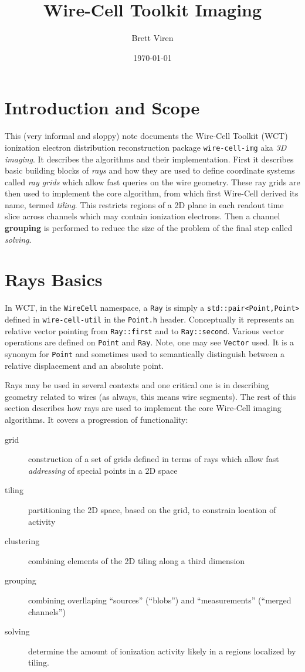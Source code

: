 \documentclass[11pt]{article}
\author{Brett Viren}
\date{\today}
\title{Wire-Cell Toolkit Imaging}
\begin{document}
\maketitle

\section{Introduction and Scope}

This (very informal and sloppy) note documents the Wire-Cell Toolkit (WCT) ionization electron distribution reconstruction package \texttt{wire-cell-img} aka \textit{3D imaging}. 
It describes the algorithms and their implementation. 
First it describes basic building blocks of \textit{rays} and how they are used to define coordinate systems called \textit{ray grids} which allow fast queries on the wire geometry. 
These ray grids are then used to implement the core algorithm, from which first Wire-Cell derived its name, termed \textit{tiling}. 
This restricts regions of a 2D plane in each readout time slice across channels which may contain ionization electrons. 
Then a channel \textbf{grouping} is performed to reduce the size of the problem of the final step called \textit{solving}.

\section{Rays Basics}
\label{sec:raybasics}

In WCT, in the \texttt{WireCell} namespace, a \texttt{Ray} is simply a \texttt{std::pair<Point,Point>} defined in \texttt{wire-cell-util} in the \texttt{Point.h} header.  Conceptually it represents an relative vector pointing from \texttt{Ray::first} and to \texttt{Ray::second}.  Various vector operations are defined on \texttt{Point} and \texttt{Ray}.  Note, one may see \texttt{Vector} used.  It is a synonym for \texttt{Point} and sometimes used to semantically distinguish between a relative displacement and an absolute point. 

Rays may be used in several contexts and one critical one is in describing geometry related to wires (as always, this means wire segments).  The rest of this section describes how rays are used to implement the core Wire-Cell imaging algorithms.  It covers a progression of functionality:

\begin{description}
\item[grid] construction of a set of grids defined in terms of rays which allow fast \emph{addressing} of special points in a 2D space
\item[tiling] partitioning the 2D space, based on the grid, to constrain location of activity
\item[clustering] combining elements of the 2D tiling along a third dimension
\item[grouping] combining overllaping ``sources'' (``blobs'') and ``measurements'' (``merged channels'') 
\item[solving] determine the amount of ionization activity likely in a regions localized by tiling. 
\end{description}
\end{document}
